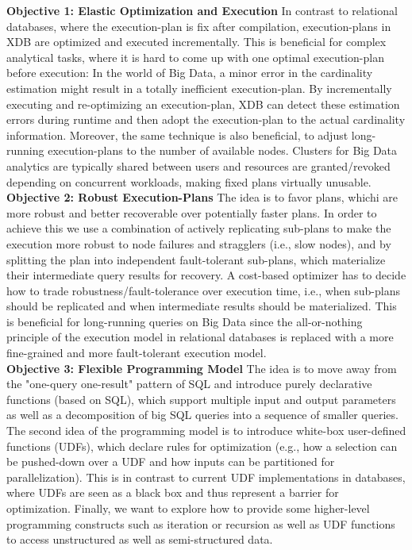 \documentclass{sig-alternate}
\begin{document}
{\bf Objective 1: Elastic Optimization and Execution}
In contrast to relational databases, where the execution-plan is fix after compilation, execution-plans in XDB are optimized and executed incrementally. This is beneficial for complex analytical tasks, where it is hard to come up with one optimal execution-plan before execution: In the world of Big Data, a minor error in the cardinality estimation might result in a totally inefficient execution-plan. By incrementally executing and re-optimizing an execution-plan, XDB can detect these estimation errors during runtime and then adopt the execution-plan to the actual cardinality information. Moreover, the same technique is also beneficial, to adjust long-running execution-plans to the number of available nodes. Clusters for Big Data analytics are typically shared between users and resources are granted/revoked depending on concurrent workloads, making fixed plans virtually unusable. \\

{\bf Objective 2:  Robust Execution-Plans}
The idea is to favor plans, whichi
are more robust and better recoverable over potentially faster plans. In order to achieve this we use a combination of actively replicating sub-plans to make the execution more robust to node failures and stragglers (i.e., slow nodes), and by splitting the plan into independent fault-tolerant sub-plans, which materialize their intermediate query results for recovery. A cost-based optimizer has to decide how to trade robustness/fault-tolerance over execution time, i.e., when sub-plans should be replicated and when intermediate results should be materialized.  This is beneficial for long-running queries on Big Data since the all-or-nothing principle of the execution model in relational databases is replaced with a more fine-grained and more fault-tolerant execution model. \\

{\bf Objective 3: Flexible Programming Model} 
The idea is to move away from the "one-query one-result" pattern of SQL and introduce purely declarative functions (based on SQL), which support multiple input and output parameters as well as a decomposition of big SQL queries into a sequence of smaller queries. The second idea of the programming model is to introduce white-box user-defined functions (UDFs), which declare rules for optimization (e.g., how a selection can be pushed-down over a UDF and how inputs can be partitioned for parallelization). This is in contrast to current UDF implementations in databases, where UDFs are seen as a black box and thus represent a barrier for optimization. Finally, we want to explore how to provide some higher-level programming constructs such as iteration or recursion as well as UDF functions to access unstructured as well as semi-structured data. \\
\end{document}
